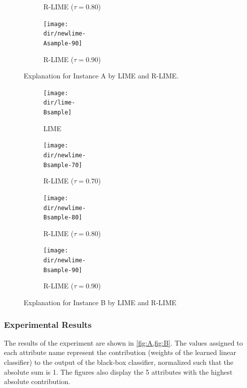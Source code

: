 \documentclass[runningheads]{llncs}
\begin{document}
{{\begin{figure}[p]
\begin{subfigure}[t]{\imgwidth}
					\caption{R-LIME ($\tau=0.80$)}\label{fig:A-rlime-80}
				\end{subfigure}
				\begin{subfigure}[t]{\imgwidth}
					\texttt{[image: \\dir/newlime-\\Asample-90]}
					\caption{R-LIME ($\tau=0.90$)}\label{fig:A-rlime-90}
				\end{subfigure}
				\caption{Explanation for Instance A by LIME and R-LIME.}\label{fig:A}
			\end{figure}
			\begin{figure}[p]
				\centering
				\begin{subfigure}[t]{\imgwidth}
					\texttt{[image: \\dir/lime-\\Bsample]}
					\caption{LIME}\label{fig:B-lime}
				\end{subfigure}
				\begin{subfigure}[t]{\imgwidth}
					\texttt{[image: \\dir/newlime-\\Bsample-70]}
					\caption{R-LIME ($\tau=0.70$)}\label{fig:B-rlime-70}
				\end{subfigure}
				\begin{subfigure}[t]{\imgwidth}
					\texttt{[image: \\dir/newlime-\\Bsample-80]}
					\caption{R-LIME ($\tau=0.80$)}\label{fig:B-rlime-80}
				\end{subfigure}
				\begin{subfigure}[t]{\imgwidth}
					\hspace{0em}
					\texttt{[image: \\dir/newlime-\\Bsample-90]}
					\caption{R-LIME ($\tau=0.90$)}\label{fig:B-rlime-90}
				\end{subfigure}
				\caption{Explanation for Instance B by LIME and R-LIME}\label{fig:B}
			\end{figure}
		}
	}
\subsubsection{Experimental Results}
The results of the experiment are shown in \cref{fig:A,fig:B}.
The values assigned to each attribute name represent the contribution
(weights of the learned linear classifier)
to the output of the black-box classifier,
normalized such that the absolute sum is 1.
The figures also display the 5 attributes with the highest absolute contribution.
\end{document}
